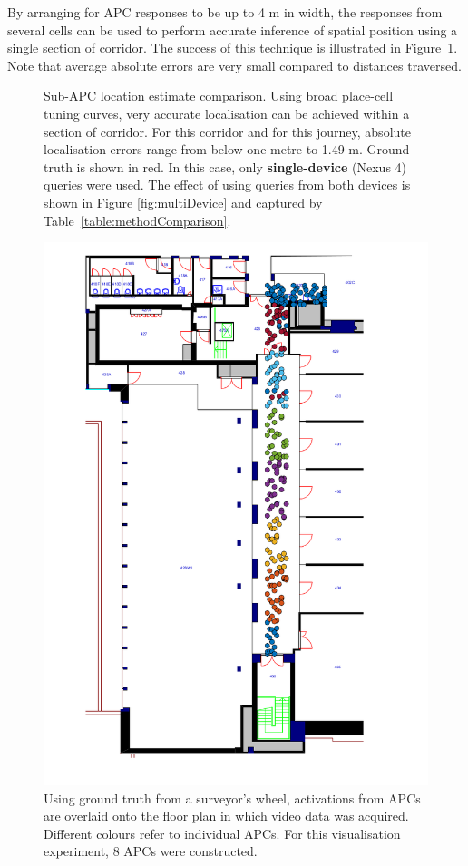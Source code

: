 By arranging for APC responses to be up to 4 m in width, the responses from several cells can be used to perform accurate inference of spatial position using a single section of corridor.  The success of this technique is illustrated in Figure~\ref{fig:sublocMethodComp}. Note that average absolute errors are very small compared to distances traversed.


\begin{figure}
\centering
	\setlength{}
	\setlength{}
		
\caption{Sub-APC location estimate comparison. Using broad place-cell tuning curves, very accurate localisation can
be achieved within a section of corridor. For this corridor and for this journey,
absolute localisation errors range from below one metre to 1.49 m. Ground truth is shown in red. In this case, only \textbf{single-device} (Nexus 4) queries were used. The effect of using queries from both devices is shown in Figure \ref{fig:multiDevice} and captured by Table~\ref{table:methodComparison}.}
\label{fig:sublocMethodComp}
\end{figure}

\begin{figure}
\centering
\includegraphics[height=\linewidth]{gfx/Chapter05/placeCellsExperiment_withDetection_5px.png}
\caption{Using ground truth from a surveyor's wheel, activations from APCs are overlaid onto the floor plan in which video data was acquired. Different colours refer to individual APCs. For this visualisation experiment, 8 APCs were constructed.}
\label{fig:floorplan}
\end{figure}

